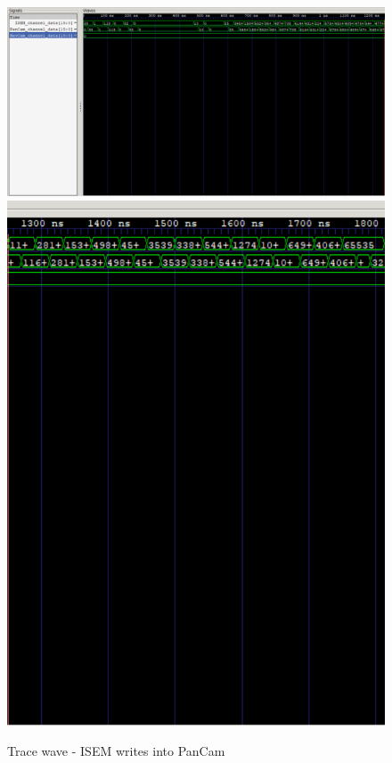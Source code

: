 \documentclass[12pt,a4paper]{article}
\begin{document}
\begin{figure}[hb]
	\centering
    \includegraphics[scale = 0.36]{results/tracewave_1.png}
    \includegraphics[scale = 0.36]{results/tracewave_2.png}
    \caption{Trace wave - ISEM writes into PanCam}
\end{figure}
\end{document}
